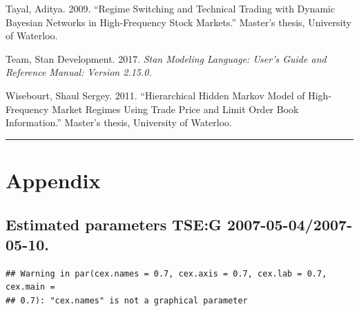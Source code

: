 \documentclass[]{article}
\begin{document}
\hypertarget{ref-tayal2009regime}{}
Tayal, Aditya. 2009. ``Regime Switching and Technical Trading with
Dynamic Bayesian Networks in High-Frequency Stock Markets.''
Master's thesis, University of Waterloo.

\hypertarget{ref-team2017stan}{}
Team, Stan Development. 2017. \emph{Stan Modeling Language: User's Guide
and Reference Manual: Version 2.15.0.}

\hypertarget{ref-wisebourt2011hierarchical}{}
Wisebourt, Shaul Sergey. 2011. ``Hierarchical Hidden Markov Model of
High-Frequency Market Regimes Using Trade Price and Limit Order Book
Information.'' Master's thesis, University of Waterloo.

\begin{center}\rule{0.5\linewidth}{\linethickness}\end{center}

\section{Appendix}\label{appendix}

\subsection{Estimated parameters TSE:G
2007-05-04/2007-05-10.}\label{estimated-parameters-tseg-2007-05-042007-05-10.}

\label{sec:appendix-tseg-parameters}

\begin{verbatim}
## Warning in par(cex.names = 0.7, cex.axis = 0.7, cex.lab = 0.7, cex.main =
## 0.7): "cex.names" is not a graphical parameter
\end{verbatim}
\end{document}
